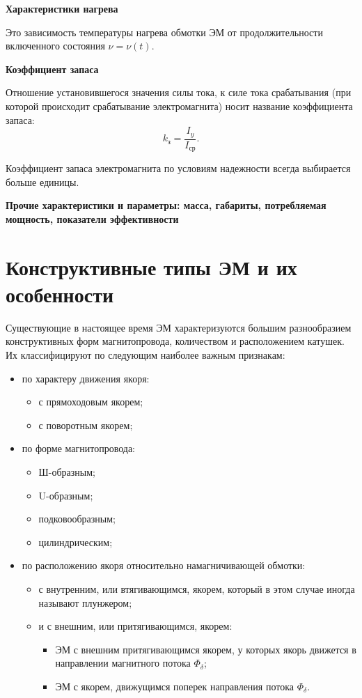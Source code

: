 \begin{flushleft}
\textbf{Характеристики нагрева}
\end{flushleft}

Это зависимость температуры нагрева обмотки ЭМ от продолжительности включенного состояния $ \nu = \nu (t) $.

\begin{flushleft}
\textbf{Коэффициент запаса}
\end{flushleft}
Отношение установившегося значения силы тока, к  силе тока срабатывания (при которой происходит срабатывание электромагнита) носит название коэффициента запаса: 
\[ k_\text{з} = \dfrac{I_y}{I_\text{ср}}. \]

Коэффициент запаса электромагнита по условиям надежности всегда выбирается больше единицы.

\begin{flushleft}
\textbf{Прочие характеристики и параметры: масса, габариты, потребляемая мощность, показатели эффективности}
\end{flushleft}

\section{Конструктивные типы ЭМ и их особенности}
Существующие в настоящее время ЭМ характеризуются большим разнообразием конструктивных форм магнитопровода, количеством и расположением катушек. Их классифицируют по следующим наиболее важным признакам:
\begin{itemize}
\item по характеру движения якоря:
\begin{itemize}
\item с прямоходовым якорем;
\item с поворотным якорем;
\end{itemize}
\item по форме магнитопровода:
\begin{itemize}
\item Ш-образным;
\item U-образным;
\item подковообразным;
\item цилиндрическим;
\end{itemize} 
\item по расположению якоря относительно намагничивающей обмотки:
\begin{itemize}
\item с внутренним, или втягивающимся, якорем, который в этом случае иногда называют плунжером;
\item и с внешним, или притягивающимся, якорем:
\begin{itemize}
\item ЭМ с внешним притягивающимся якорем, у которых якорь движется в направлении магнитного потока $ \Phi_\delta $;
\item ЭМ с якорем, движущимся поперек направления потока $ \Phi_\delta $.
\end{itemize}
\end{itemize} 
\end{itemize}

